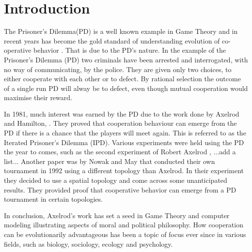 \chapter{Introduction}

The Prisoner's Dilemma(PD) is a well known example in Game Theory and in recent
years has become the gold standard of understanding evolution of co-operative
behavior \parencite{Lorberbaum1994}.
That is due to the PD's nature.  In the
example of the Prisoner's Dilemma (PD) two criminals have been arrested and
interrogated, with no way of communicating, by the police.  They are given only
two choices, to either cooperate with each other or to defect.  By rational
selection the outcome of a single run PD will alway be to defect, even though
mutual cooperation would maximise their reward.

In 1981, much interest was earned by the PD due to the work done by Axelrod and
Hamilton, \parencite{Axelrod_&_Hamilton1981}. They proved that cooperation
behaviour can emerge from the PD if there is a chance that the players will meet
again.  This is referred to as the Iterated Prisoner's Dilemma (IPD). Various
experiments were held using the PD the year to comes, such as the second
experiment of Robert Axelrod \parencite{Axelrod1980b}, ...add a list...  Another
paper was by Nowak and May \parencite{Nowak_&_May1992} that conducted their own
tournament in 1992 using a different topology than Axelrod.
In their experiment
they decided to use a spatial topology and come across some unanticipated
results. They provided proof that cooperative behavior can emerge from a PD
tournament in certain topologies.

In conclusion, Axelrod's work has set a seed in Game Theory and computer modeling
illustrating aspects of moral and political philosophy. How cooperation can be
evolutionarily advantageous has been a topic of focus ever since in various fields,
such as biology, sociology, ecology and psychology.


